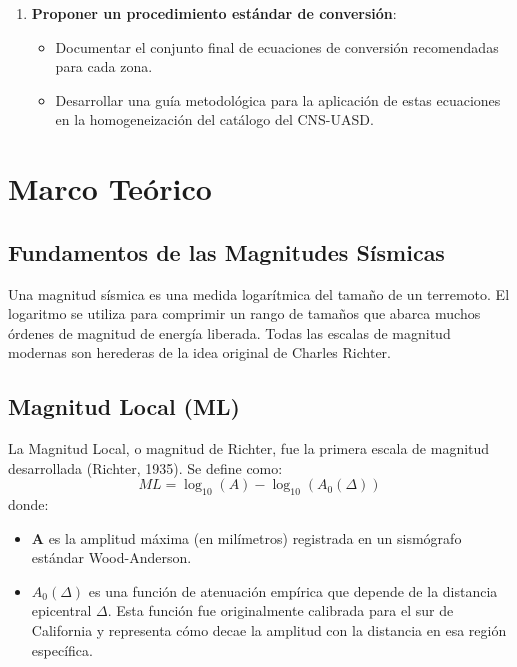 \documentclass[12pt,a4paper]{article}
\begin{document}
\begin{enumerate}
\begin{itemize}
            \item Analizar los residuos del modelo para evaluar su bondad de ajuste y detectar posibles sesgos.
            \item Comparar las conversiones obtenidas con las relaciones de escalamiento genéricas utilizadas internacionalmente para cuantificar la mejora.
        \end{itemize}
    \item \textbf{Proponer un procedimiento estándar de conversión}:
        \begin{itemize}
            \item Documentar el conjunto final de ecuaciones de conversión recomendadas para cada zona.
            \item Desarrollar una guía metodológica para la aplicación de estas ecuaciones en la homogeneización del catálogo del CNS-UASD.
        \end{itemize}
\end{enumerate}

\section{Marco Teórico}
\subsection{Fundamentos de las Magnitudes Sísmicas}
Una magnitud sísmica es una medida logarítmica del tamaño de un terremoto. El logaritmo se utiliza para comprimir un rango de tamaños que abarca muchos órdenes de magnitud de energía liberada. Todas las escalas de magnitud modernas son herederas de la idea original de Charles Richter.

\subsection{Magnitud Local (ML)}
La Magnitud Local, o magnitud de Richter, fue la primera escala de magnitud desarrollada (Richter, 1935). Se define como:
\begin{equation}
ML = \log_{10}(A) - \log_{10}(A_0(\Delta))
\end{equation}
donde:
\begin{itemize}
    \item \textbf{A} es la amplitud máxima (en milímetros) registrada en un sismógrafo estándar Wood-Anderson.
    \item $A_0(\Delta)$ es una función de atenuación empírica que depende de la distancia epicentral $\Delta$. Esta función fue originalmente calibrada para el sur de California y representa cómo decae la amplitud con la distancia en esa región específica.
\end{itemize}
\end{document}
